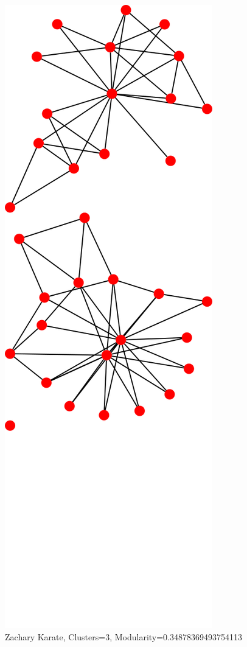 \documentclass{article}
\begin{document}
\begin{figure}[H]
  \centering
  \caption{Zachary Karate, Clusters=3, Modularity=0.34878369493754113}
  \includegraphics[scale=.32]{3-karate.png}
\end{figure}
\clearpage
\end{document}
